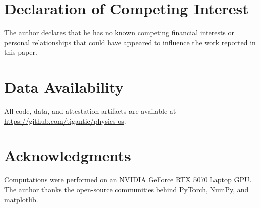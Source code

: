 \documentclass[preprint,12pt,authoryear]{elsarticle}
\theoremstyle{definition}
\begin{document}
\section*{Declaration of Competing Interest}

The author declares that he has no known competing financial interests or personal relationships that could have appeared to influence the work reported in this paper.

\section*{Data Availability}

All code, data, and attestation artifacts are available at \url{https://github.com/tigantic/physics-os}.

\section*{Acknowledgments}

Computations were performed on an NVIDIA GeForce RTX 5070 Laptop GPU.
The author thanks the open-source communities behind PyTorch, NumPy, and matplotlib.
\end{document}
